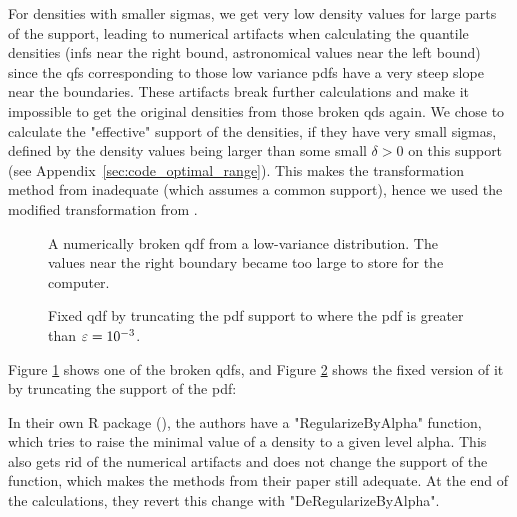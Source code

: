 For densities with smaller sigmas, we get very low density values for large parts of the
support, leading to numerical artifacts when calculating the quantile densities (infs
near the right bound, astronomical values near the left bound) since the qfs corresponding to
those low variance pdfs have a very steep slope near the boundaries. These artifacts
break further calculations and make it impossible to get the original densities from those broken qds
again. We chose to calculate the "effective" support of the densities, if they have very
small sigmas, defined by the density values being larger than some small $\delta > 0$ on
this support (see Appendix~\ref{sec:code_optimal_range}). This makes the transformation
method from \textcite{PetersenMüller2016} inadequate (which assumes a common support),
hence we used the modified transformation from \textcite{KokoszkaEtAl2019}.

\begin{figure}[h]
    \centering
    \resizebox{0.9\textwidth}{!}{}
    \caption[Example of broken qdf]{A numerically broken qdf from a low-variance distribution.
    The values near the right boundary became too large to store for the computer.}
    \label{fig:broken_qdf}
\end{figure}

\begin{figure}[h]
    \centering
    \resizebox{0.9\textwidth}{!}{}
    \caption[Example of fixed qdf]{Fixed qdf by truncating the pdf support to where
    the pdf is greater than $\varepsilon = \nobreak 10^{-3}$.}
    \label{fig:fixed_qdf}
\end{figure}

Figure \ref{fig:broken_qdf} shows one of the broken qdfs, and Figure \ref{fig:fixed_qdf}
shows the fixed version of it by truncating the support of the pdf:

In their own R package (), the authors have a "RegularizeByAlpha"
function, which tries to raise the minimal value of a density to a given level alpha. This
also gets rid of the numerical artifacts and does not change the support of the function,
which makes the methods from their paper still adequate. At the end of the calculations, they
revert this change with "DeRegularizeByAlpha".